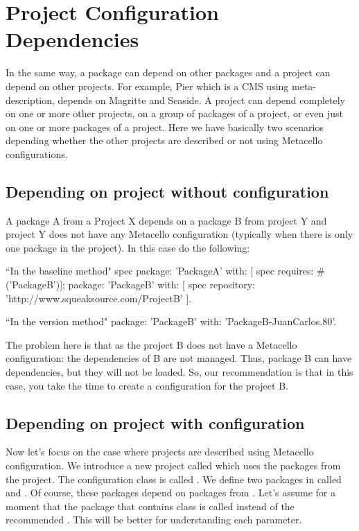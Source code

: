 \documentclass[a4paper,10pt,twoside]{book}
\begin{document}
\section{Project Configuration Dependencies}

In the same way, a package can depend on other packages and a project can depend on other projects.  For example, Pier which is a CMS using meta-description, depends on Magritte and Seaside.  A project can depend completely on one or more other projects, on a group of packages of a project, or even just on one or more packages of a project. Here we have basically two scenarios depending whether the other projects are described or not using Metacello configurations. 

\subsection{Depending on project without configuration}

A package A from a Project X depends on a package B from project Y and project Y does not have any Metacello configuration (typically when there is only one package in the project). In this case do the following:
\begin{code}{}
		``In the baseline method"
		spec 
			package: 'PackageA' with: [  spec requires: #('PackageB')];
			package: 'PackageB' with: [  spec repository: 'http://www.squeaksource.com/ProjectB' ].	
\end{code}

\begin{code}{}
		``In the version method"
		package: 'PackageB' with: 'PackageB-JuanCarlos.80'.
\end{code}

The problem here is that as the project B does not have a Metacello configuration: the dependencies of B are not managed. Thus, package B can have dependencies, but they will not be loaded. So, our recommendation is that in this case, you take the time to create a configuration for the project B.

\subsection{Depending on project with configuration}
Now let's focus on the case where projects are described using Metacello configuration.
We introduce a new project called  which uses the packages from the  project. The configuration class is called . We define two packages in  called  and . Of course, these packages depend on packages from . Let's assume for a moment that the package that contains  class is called  instead of the recommended . This will be better for understanding each parameter. 
\end{document}
